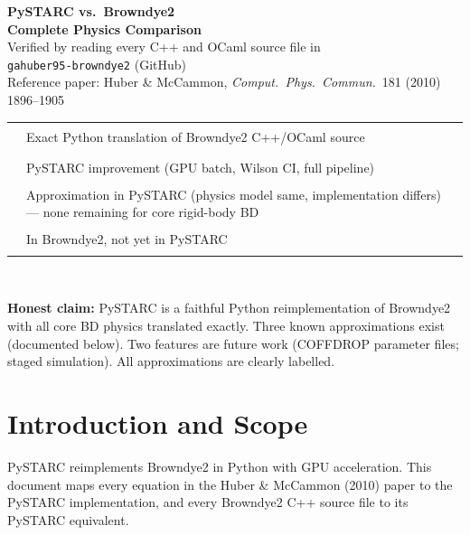 \documentclass[12pt,a4paper]{article}
\begin{document}
\begin{titlepage}\centering\vspace*{2cm}
{\LARGE\bfseries PySTARC vs.\ Browndye2\\[0.4em]
\large Complete Physics Comparison}\\[0.8em]
{\normalsize Verified by reading every C++ and OCaml source file in\\
\texttt{gahuber95-browndye2} (GitHub)}\\[0.5em]
{\normalsize Reference paper: Huber \& McCammon,
\textit{Comput.\ Phys.\ Commun.}\ 181 (2010) 1896--1905}\\[2.5em]

\begin{tabular}{cp{11cm}}
\textcolor{cgreen}{\rule{1.2cm}{6pt}} &
  Exact Python translation of Browndye2 C++/OCaml source\\[4pt]
\textcolor{cblue}{\rule{1.2cm}{6pt}}  &
  PySTARC improvement (GPU batch, Wilson CI, full pipeline)\\[4pt]
\textcolor{corange}{\rule{1.2cm}{6pt}} &
  Approximation in PySTARC (physics model same, implementation differs)
  --- none remaining for core rigid-body BD\\[4pt]
\textcolor{cred}{\rule{1.2cm}{6pt}}   &
  In Browndye2, not yet in PySTARC\\
\end{tabular}\\[2em]

\begin{tcolorbox}[colback=yellow!10,colframe=orange!60!black,width=0.85\textwidth]
\textbf{Honest claim:} PySTARC is a faithful Python reimplementation of Browndye2
with all core BD physics translated exactly. Three known approximations exist
(documented below). Two features are future work (COFFDROP parameter files;
staged simulation). All approximations are clearly labelled.
\end{tcolorbox}
\end{titlepage}

\tableofcontents\newpage

\section{Introduction and Scope}

PySTARC reimplements Browndye2 in Python with GPU acceleration. This document
maps every equation in the Huber \& McCammon (2010) paper to the PySTARC
implementation, and every Browndye2 C++ source file to its PySTARC equivalent.
\end{document}

